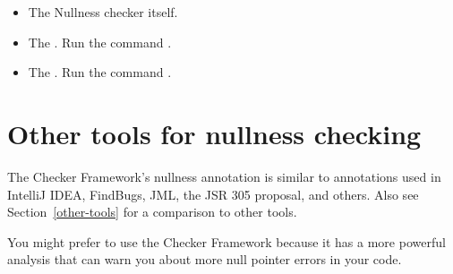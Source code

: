 \begin{itemize}
\item
The Nullness checker itself.

\item
The
.
Run the command .


\item
The
.
Run the command .

%
%
%

\end{itemize}


\section{Other tools for nullness checking\label{nullness-related-work}}

\newcommand{\linktoNonNull}{\code{\refclass{nullness/quals}{NonNull}}}
\newcommand{\linktoNullable}{\code{\refclass{nullness/quals}{Nullable}}}

The Checker Framework's nullness annotation is similar to annotations used
in IntelliJ IDEA, FindBugs, JML, the JSR 305 proposal, and others.  Also
see Section~\ref{other-tools} for a comparison to other tools.

You might prefer to use the Checker Framework because it has a more
powerful analysis that can warn you about more null pointer errors in your
code.

